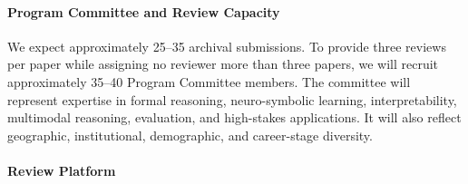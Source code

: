 \documentclass[11pt]{article}
\begin{document}




\paragraph{Program Committee and Review Capacity}

We expect approximately 25--35 archival submissions. To provide three
reviews per paper while assigning no reviewer more than three papers,
we will recruit approximately 35--40 Program Committee members. The
committee will represent expertise in formal reasoning, neuro-symbolic
learning, interpretability, multimodal reasoning, evaluation, and
high-stakes applications. It will also reflect geographic,
institutional, demographic, and career-stage diversity.


\paragraph{Review Platform}
\end{document}
